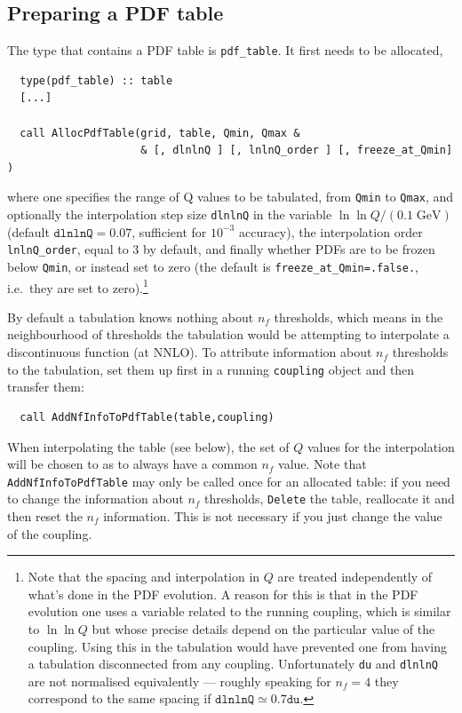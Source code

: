 \documentclass[12pt]{article}
\newcommand{\GeV}{\;\mathrm{GeV}}
\newcommand{\ie}{i.e.\ }
\newcommand{\ttt}[1]{\texttt{#1}}
\begin{document}
\subsection{Preparing a PDF table}
The type that contains a PDF table is \ttt{pdf\_table}. It first needs
to be allocated,
\begin{lstlisting}
  type(pdf_table) :: table
  [...]

  call AllocPdfTable(grid, table, Qmin, Qmax &
                     & [, dlnlnQ ] [, lnlnQ_order ] [, freeze_at_Qmin] )
\end{lstlisting}
where one specifies the range of Q values to be tabulated, from
\ttt{Qmin} to \ttt{Qmax}, and optionally the interpolation step size
\ttt{dlnlnQ} in the variable $\ln \ln Q/(0.1\GeV)$ (default
$\ttt{dlnlnQ}=0.07$, sufficient for $10^{-3}$ accuracy), the
interpolation order \ttt{lnlnQ\_order}, equal to $3$ by default, and
finally whether PDFs are to be frozen below \ttt{Qmin}, or instead set
to zero (the default is \ttt{freeze\_at\_Qmin=.false.}, \ie they are
set to zero).\footnote{Note that the spacing and interpolation in $Q$
  are treated independently of what's done in the PDF evolution. A
  reason for this is that in the PDF evolution one uses a variable
  related to the running coupling, which is similar to $\ln \ln Q$ but
  whose precise details depend on the particular value of the
  coupling.  Using this in the tabulation would have prevented one
  from having a tabulation disconnected from any coupling.
  Unfortunately \ttt{du} and \ttt{dlnlnQ} are not normalised
  equivalently --- roughly speaking for $n_f = 4$ they correspond to
  the same spacing if $\ttt{dlnlnQ} \simeq 0.7 \ttt{du}$.}

By default a tabulation knows nothing about $n_f$ thresholds, which
means in the neighbourhood of thresholds the tabulation would be
attempting to interpolate a discontinuous function (at NNLO). To
attribute information about $n_f$ thresholds to the tabulation, set
them up first in a running \ttt{coupling} object and then transfer
them:
\begin{lstlisting}
  call AddNfInfoToPdfTable(table,coupling)
\end{lstlisting}
When interpolating the table (see below), the set of $Q$ values for
the interpolation will be chosen to as to always have a common $n_f$
value. Note that \ttt{AddNfInfoToPdfTable} may only be called once for
an allocated table: if you need to change the information about $n_f$
thresholds, \ttt{Delete} the table, reallocate it and then reset the
$n_f$ information. This is not necessary if you just
change the value of the coupling.
\end{document}
